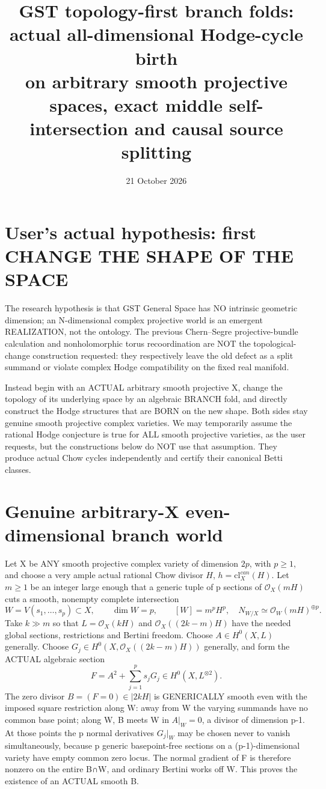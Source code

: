 \documentclass[11pt]{article}
\title{GST topology-first branch folds: actual all-dimensional Hodge-cycle birth\\
on arbitrary smooth projective spaces, exact middle self-intersection and causal source splitting}
\date{21 October 2026}
\newcommand{\OO}{\mathcal O}
\newcommand{\cl}{\mathrm{cl}}
\begin{document}
\maketitle

\section{User's actual hypothesis: first CHANGE THE SHAPE OF THE SPACE}
The research hypothesis is that GST General Space has NO intrinsic
geometric dimension; an N-dimensional complex projective world is
an emergent REALIZATION, not the ontology.
The previous Chern--Segre projective-bundle calculation
and nonholomorphic torus recoordination are NOT the
topological-change construction requested: they respectively
leave the old defect as a split summand or violate complex
Hodge compatibility on the fixed real manifold.

Instead begin with an ACTUAL arbitrary smooth projective X,
change the topology of its underlying space by an algebraic
BRANCH fold, and directly construct the Hodge structures
that are BORN on the new shape.
Both sides stay genuine smooth projective complex varieties.
We may temporarily assume the rational Hodge conjecture is
true for ALL smooth projective varieties, as the user requests,
but the constructions below do NOT use that assumption.
They produce actual Chow cycles independently and certify
their canonical Betti classes.

\section{Genuine arbitrary-X even-dimensional branch world}
Let X be ANY smooth projective complex variety of dimension
\(2p\), with \(p\ge1\), and choose a very ample
actual rational Chow divisor \(H\), \(h=\cl_X^{can}(H)\).
Let \(m\ge1\) be an integer large enough that a generic
tuple of p sections of \(\OO_X(mH)\) cuts a smooth,
nonempty complete intersection
\[
 W=V(s_1,\dots,s_p)\subset X,\qquad
 \dim W=p,\qquad
 [W]=m^pH^p,\quad
 N_{W/X}\simeq\OO_W(mH)^{\oplus p}.
                                                               \tag{1}
\]
Take \(k\gg m\) so that \(L=\OO_X(kH)\) and
\(\OO_X((2k-m)H)\) have the needed global sections,
restrictions and Bertini freedom.
Choose \(A\in H^0(X,L)\) generally.
Choose \(G_j\in H^0(X,\OO_X((2k-m)H))\) generally,
and form the ACTUAL algebraic section
\[
 \boxed{
 F=A^2+\sum_{j=1}^p s_jG_j
            \in H^0(X,L^{\otimes2}).
 }                                                        \tag{2}
\]
The zero divisor \(B=(F=0)\in|2kH|\)
is GENERICALLY smooth even with the imposed square
restriction along W: away from W the varying summands
have no common base point; along W, B meets W in
\(A|_W=0\), a divisor of dimension p-1.
At those points the p normal derivatives \(G_j|_W\)
may be chosen never to vanish simultaneously, because
p generic basepoint-free sections on a
(p-1)-dimensional variety have empty common zero locus.
The normal gradient of F is therefore nonzero on
the entire B∩W, and ordinary Bertini works off W.
This proves the existence of an ACTUAL smooth B.
\end{document}
